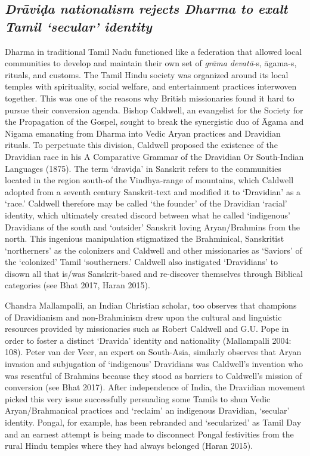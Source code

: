 \subsection*{\textit{Drāviḍa nationalism rejects Dharma to exalt Tamil ‘secular’ identity }}

\vskip -8pt

Dharma in traditional Tamil Nadu functioned like a federation that allowed local communities to develop and maintain their own set of \textit{grāma devatā}-s, āgama-s, rituals, and customs. The Tamil Hindu society was organized around its local temples with spirituality, social welfare, and entertainment practices interwoven together. This was one of the reasons why British missionaries found it hard to pursue their conversion agenda. Bishop Caldwell, an evangelist for the Society for the Propagation of the Gospel, sought to break the synergistic duo of Āgama and Nigama emanating from Dharma into Vedic Aryan practices and Dravidian rituals. To perpetuate this division, Caldwell proposed the existence of the Dravidian race in his A Comparative Grammar of the Dravidian Or South-Indian Languages (1875). The term ‘draviḍa’ in Sanskrit refers to the communities located in the region south-of the Vindhya-range of mountains, which Caldwell adopted from a seventh century Sanskrit-text and modified it to ‘Dravidian’ as a ‘race.’ Caldwell therefore may be called ‘the founder’ of the Dravidian ‘racial’ identity, which ultimately created discord between what he called ‘indigenous’ Dravidians of the south and ‘outsider’ Sanskrit loving Aryan/Brahmins from the north. This ingenious manipulation stigmatized the Brahminical, Sanskritist ‘northerners’ as the colonizers and Caldwell and other missionaries as ‘Saviors’ of the ‘colonized’ Tamil ‘southerners.’ Caldwell also instigated ‘Dravidians’ to disown all that is/was Sanskrit-based and re-discover themselves through Biblical categories (see Bhat 2017, Haran 2015).

Chandra Mallampalli, an Indian Christian scholar, too observes that champions of Dravidianism and non-Brahminism drew upon the cultural and linguistic resources provided by missionaries such as Robert Caldwell and G.U. Pope in order to foster a distinct ‘Dravida’ identity and nationality (Mallampalli 2004: 108). Peter van der Veer, an expert on South-Asia, similarly observes that Aryan invasion and subjugation of ‘indigenous’ Dravidians was Caldwell’s invention who was resentful of Brahmins because they stood as barriers to Caldwell’s mission of conversion (see Bhat 2017). After independence of India, the Dravidian movement picked this very issue successfully persuading some Tamils to shun Vedic Aryan/Brahmanical practices and ‘reclaim’ an indigenous Dravidian, ‘secular’ identity. Pongal, for example, has been rebranded and ‘secularized’ as Tamil Day and an earnest attempt is being made to disconnect Pongal festivities from the rural Hindu temples where they had always belonged (Haran 2015).


